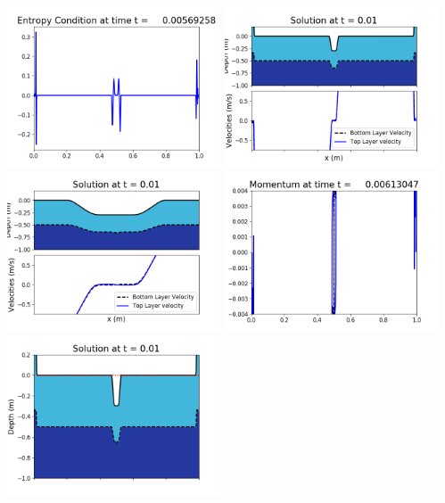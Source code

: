 \documentclass[11pt]{article}
\begin{document}
\vskip 10pt 
\includegraphics[width=0.475\textwidth]{frame0014fig1009.png}
\vskip 10pt 
\includegraphics[width=0.475\textwidth]{frame0015fig1001.png}
\includegraphics[width=0.475\textwidth]{frame0015fig1002.png}
\vskip 10pt 
\includegraphics[width=0.475\textwidth]{frame0015fig1003.png}
\includegraphics[width=0.475\textwidth]{frame0015fig1006.png}
\end{document}
